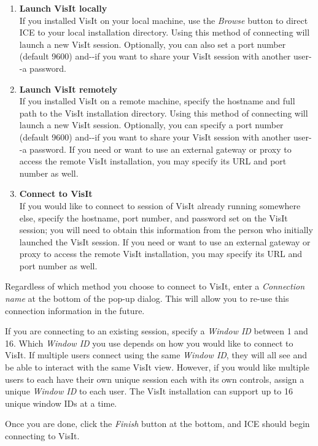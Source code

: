 \begin{enumerate}
\itemsep1pt\parskip0pt
\item
  \textbf{Launch VisIt locally}\\If you installed VisIt on your local
  machine, use the \emph{Browse} button to direct ICE to your local
  installation directory. Using this method of connecting will launch a
  new VisIt session. Optionally, you can also set a port number (default
  9600) and-\/-if you want to share your VisIt session with another
  user-\/-a password.
\item
  \textbf{Launch VisIt remotely}\\If you installed VisIt on a remote
  machine, specify the hostname and full path to the VisIt installation
  directory. Using this method of connecting will launch a new VisIt
  session. Optionally, you can specify a port number (default 9600)
  and-\/-if you want to share your VisIt session with another user-\/-a
  password. If you need or want to use an external gateway or proxy to
  access the remote VisIt installation, you may specify its URL and port
  number as well.
\item
  \textbf{Connect to VisIt}\\If you would like to connect to session of
  VisIt already running somewhere else, specify the hostname, port
  number, and password set on the VisIt session; you will need to obtain
  this information from the person who initially launched the VisIt
  session. If you need or want to use an external gateway or proxy to
  access the remote VisIt installation, you may specify its URL and port
  number as well.
\end{enumerate}

Regardless of which method you choose to connect to VisIt, enter a
\emph{Connection name} at the bottom of the pop-up dialog. This will
allow you to re-use this connection information in the future.

If you are connecting to an existing session, specify a \emph{Window ID}
between 1 and 16. Which \emph{Window ID} you use depends on how you
would like to connect to VisIt. If multiple users connect using the same
\emph{Window ID}, they will all see and be able to interact with the
same VisIt view. However, if you would like multiple users to each have
their own unique session each with its own controls, assign a unique
\emph{Window ID} to each user. The VisIt installation can support up to
16 unique window IDs at a time.

Once you are done, click the \emph{Finish} button at the bottom, and ICE
should begin connecting to VisIt.

